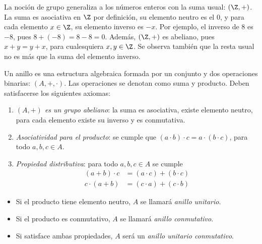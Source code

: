 \begin{obss}
    \item La noción de grupo generaliza a los números enteros con la suma usual: $(\Z,+)$. 
    La suma es asociativa en $\Z$ por definición, su elemento neutro es el $0$, y para cada elemento $x \in \Z$, su elemento inverso es $-x$. Por ejemplo, el inverso de $8$ es $-8$, pues $ 8 + (-8) = 8 - 8 = 0$. Además, $(\Z,+)$ es abeliano, pues $x + y = y + x$, para cualesquiera $x,y \in \Z$. Se observa también que la resta usual no es más que la suma del elemento inverso.
\end{obss}




\begin{deff}[Anillo]{\cite[p.~19]{GamboaAnillos}}
     Un anillo es una estructura algebraica formada por un conjunto y dos operaciones binarias: $(A, +, \cdot)$. Las operaciones se denotan como suma y producto. Deben satisfacerse los siguientes axiomas:
     
    \begin{enumerate}[label=\roman*)]
        \item \textit{$(A, +)$ es un grupo abeliano}: la suma es asociativa, existe elemento neutro, para cada elemento existe su inverso y es conmutativa.
        \item \textit{Asociatividad para el producto}: se cumple que $ (a \cdot b) \cdot c = a \cdot (b \cdot c)$, para todo $a,b,c\in A$.
        \item \textit{Propiedad distributiva}: para todo $a,b,c\in A$ se cumple 
        \begin{align*}
            (a + b) \cdot c &= (a \cdot c) + (b \cdot c) \\
            c \cdot (a + b) &= (c \cdot a) + (c \cdot b) 
        \end{align*}
    \end{enumerate}

    \begin{itemize}
        \item Si el producto tiene elemento neutro, $A$ se llamará \textit{anillo unitario}.
        \item Si el producto es conmutativo, $A$ se llamará \textit{anillo conmutativo}.
        \item Si satisface ambas propiedades, $A$ será un \textit{anillo unitario conmutativo}.
    \end{itemize}
    
\end{deff}

